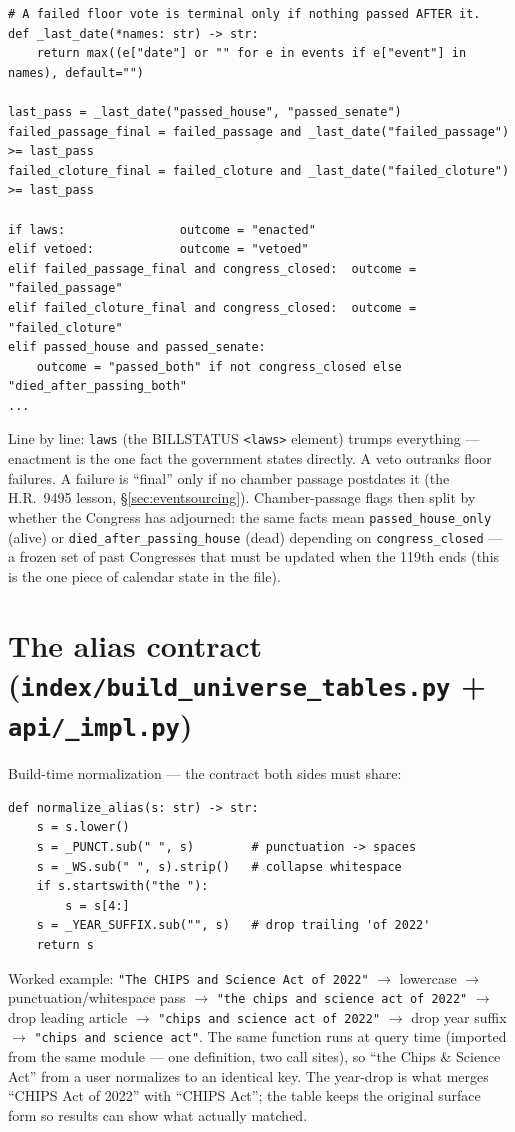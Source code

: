 \documentclass[11pt]{article}
\newcommand{\file}[1]{\texttt{#1}}
\newcommand{\code}[1]{\texttt{#1}}
\begin{document}
\begin{lstlisting}
# A failed floor vote is terminal only if nothing passed AFTER it.
def _last_date(*names: str) -> str:
    return max((e["date"] or "" for e in events if e["event"] in names), default="")

last_pass = _last_date("passed_house", "passed_senate")
failed_passage_final = failed_passage and _last_date("failed_passage") >= last_pass
failed_cloture_final = failed_cloture and _last_date("failed_cloture") >= last_pass

if laws:                outcome = "enacted"
elif vetoed:            outcome = "vetoed"
elif failed_passage_final and congress_closed:  outcome = "failed_passage"
elif failed_cloture_final and congress_closed:  outcome = "failed_cloture"
elif passed_house and passed_senate:
    outcome = "passed_both" if not congress_closed else "died_after_passing_both"
...
\end{lstlisting}

Line by line: \code{laws} (the BILLSTATUS \code{<laws>} element) trumps
everything --- enactment is the one fact the government states directly.
A veto outranks floor failures. A failure is ``final'' only if no chamber
passage postdates it (the H.R.~9495 lesson, \S\ref{sec:eventsourcing}).
Chamber-passage flags then split by whether the Congress has adjourned:
the same facts mean \code{passed\_house\_only} (alive) or
\code{died\_after\_passing\_house} (dead) depending on
\code{congress\_closed} --- a frozen set of past Congresses that must be
updated when the 119th ends (this is the one piece of calendar state in the
file).

\section{The alias contract (\file{index/build\_universe\_tables.py} +
\file{api/\_impl.py})}
\label{sec:lookupcode}

Build-time normalization --- the contract both sides must share:

\begin{lstlisting}
def normalize_alias(s: str) -> str:
    s = s.lower()
    s = _PUNCT.sub(" ", s)        # punctuation -> spaces
    s = _WS.sub(" ", s).strip()   # collapse whitespace
    if s.startswith("the "):
        s = s[4:]
    s = _YEAR_SUFFIX.sub("", s)   # drop trailing 'of 2022'
    return s
\end{lstlisting}

Worked example: \code{"The CHIPS and Science Act of 2022"} $\to$ lowercase
$\to$ punctuation/whitespace pass $\to$ \code{"the chips and science act of
2022"} $\to$ drop leading article $\to$ \code{"chips and science act of
2022"} $\to$ drop year suffix $\to$ \code{"chips and science act"}. The same
function runs at query time (imported from the same module --- one
definition, two call sites), so ``the Chips \& Science Act'' from a user
normalizes to an identical key. The year-drop is what merges ``CHIPS Act of
2022'' with ``CHIPS Act''; the table keeps the original surface form so
results can show what actually matched.
\end{document}
